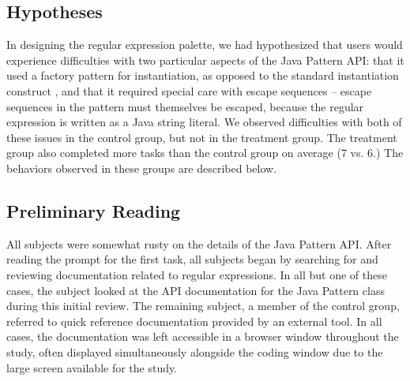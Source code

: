 \documentclass[10pt, conference, compsocconf]{IEEEtran}
\begin{document}
\subsection{Hypotheses}
In designing the regular expression palette, we had hypothesized that users would experience difficulties with two particular aspects of the Java Pattern API: that it used a factory pattern for instantiation, as opposed to the standard instantiation construct \cite{ellis_factory_2007}, and that it required special care with escape sequences -- escape sequences in the pattern must themselves be escaped, because the regular expression is written as a Java string literal. We observed difficulties with both of these issues in the control group, but not in the treatment group. The treatment group also completed more tasks than the control group on average (7 vs. 6.) The behaviors observed in these groups are described below.

\subsection{Preliminary Reading}
All subjects were somewhat rusty on the details of the Java Pattern API. After reading the prompt for the first task, all subjects began by searching for and reviewing documentation related to regular expressions. In all but one of these cases, the subject looked at the API documentation for the Java Pattern class during this initial review. The remaining subject, a member of the control group, referred to quick reference documentation provided by an external tool. In all cases, the documentation was left accessible in a browser window throughout the study, often displayed simultaneously alongside the coding window due to the large screen available for the study.
\end{document}
